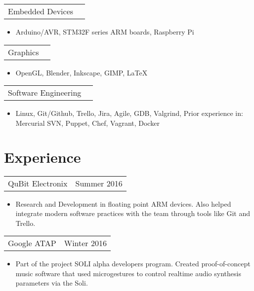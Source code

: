 \documentclass[margin]{res}
\begin{document}
\begin{resume}
\begin{tabular}{p{3in} r} %
Embedded Devices
\end{tabular}	
\begin{itemize} %
\item[] Arduino/AVR, STM32F series ARM boards, Raspberry Pi
\end{itemize} 

\begin{tabular}{p{3in} r} %
Graphics
\end{tabular}	
\begin{itemize} %
\item[] OpenGL, Blender, Inkscape, GIMP, LaTeX
\end{itemize} 

\begin{tabular}{p{3in} r} %
Software Engineering
\end{tabular}	
\begin{itemize} %
\item[] Linux, Git/Github, Trello, Jira, Agile, GDB, Valgrind, 
    Prior experience in: Mercurial SVN, Puppet, Chef, Vagrant, Docker
\end{itemize} 


\section{Experience}      

\begin{tabular}{p{3in} r} 
QuBit Electronix &  Summer 2016
\end{tabular}	
\begin{itemize} %
\item[] Research and Development in floating point ARM devices. Also helped 
integrate modern software practices with the team through tools like Git and
Trello.
\end{itemize} 

\begin{tabular}{p{3in} r} %
Google ATAP & Winter 2016
\end{tabular}	
\begin{itemize} %
\item[] Part of the project SOLI alpha developers program. Created proof-of-concept
music software that used microgestures to control realtime audio synthesis 
parameters via the Soli. 
\end{itemize} 


\end{resume}
\end{document}
